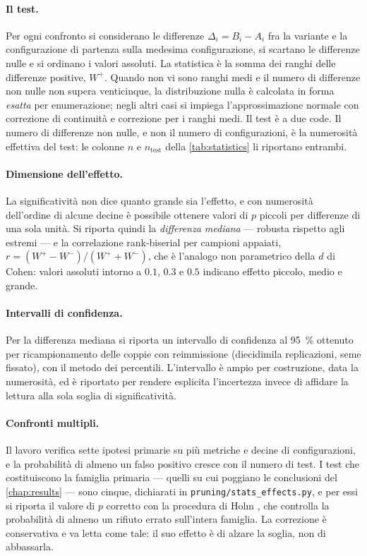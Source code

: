 \paragraph{Il test.} Per ogni confronto si considerano le differenze $\Delta_i = B_i - A_i$ fra la
variante e la configurazione di partenza sulla medesima configurazione, si scartano le differenze
nulle e si ordinano i valori assoluti. La statistica è la somma dei ranghi delle differenze
positive, $W^+$. Quando non vi sono ranghi medi e il numero di differenze non nulle non supera
venticinque, la distribuzione nulla è calcolata in forma \emph{esatta} per enumerazione; negli
altri casi si impiega l'approssimazione normale con correzione di continuità e correzione per i
ranghi medi. Il test è a due code. Il numero di differenze non nulle, e non il numero di
configurazioni, è la numerosità effettiva del test: le colonne $n$ e $n_{\text{test}}$ della
\autoref{tab:statistics} li riportano entrambi.

\paragraph{Dimensione dell'effetto.} La significatività non dice quanto grande sia l'effetto, e con
numerosità dell'ordine di alcune decine è possibile ottenere valori di $p$ piccoli per differenze
di una sola unità. Si riporta quindi la \emph{differenza mediana} --- robusta rispetto agli
estremi --- e la correlazione rank-biserial per campioni appaiati,
$r = (W^+ - W^-) / (W^+ + W^-)$, che è l'analogo non parametrico della $d$ di Cohen: valori
assoluti intorno a $0.1$, $0.3$ e $0.5$ indicano effetto piccolo, medio e grande.

\paragraph{Intervalli di confidenza.} Per la differenza mediana si riporta un intervallo di
confidenza al \SI{95}{\percent} ottenuto per ricampionamento delle coppie con reimmissione
(diecidimila replicazioni, seme fissato), con il metodo dei percentili. L'intervallo è ampio per
costruzione, data la numerosità, ed è riportato per rendere esplicita l'incertezza invece di
affidare la lettura alla sola soglia di significatività.

\paragraph{Confronti multipli.} Il lavoro verifica sette ipotesi primarie su più metriche e
decine di configurazioni, e la probabilità di almeno un falso positivo cresce con il numero di
test. I test che costituiscono la famiglia primaria --- quelli su cui poggiano le conclusioni del
\autoref{chap:results} --- sono cinque, dichiarati in
\texttt{pruning/stats\_effects.py}, e per essi si riporta il valore di $p$ corretto con la
procedura di Holm \cite{holm1979simple}, che controlla la probabilità di almeno un rifiuto errato
sull'intera famiglia. La correzione è conservativa e va letta come tale: il suo effetto è di
alzare la soglia, non di abbassarla.

